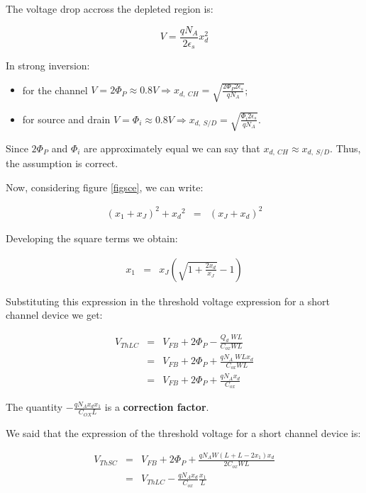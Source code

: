 \documentclass[a4paper, 12pt, twoside, openright]{report}
\begin{document}
{{{{\begin{itemize}
	The voltage drop accross the depleted region is:
	
	\begin{equation}
	V = \frac{q N_A}{2 \epsilon_s} x_d^2
	\end{equation}
	
	In strong inversion:
		\begin{itemize}
		\item for the channel $V = 2\Phi_P \approx 0.8 V \Rightarrow x_{d,\ CH} = \sqrt{\frac{2 \Phi_P 2 \epsilon_s}{q N_A}}$;
		\item for source and drain $V = \Phi_i \approx 0.8 V \Rightarrow x_{d,\ S/D} = \sqrt{\frac{\Phi_i 2 \epsilon_s}{q N_A}}$.
		\end{itemize}
	
	Since $2\Phi_P$ and $\Phi_i$ are approximately equal we can say that $x_{d,\ CH} \approx x_{d,\ S/D}$. Thus, the assumption is correct.
	\end{itemize}

Now, considering figure \ref{figsce}, we can write:

	\begin{eqnarray*}
	 \left(x_1+ x_J\right)^2 + {x_d}^2 &=& \left(x_J+ x_d \right)^2
	\end{eqnarray*}

Developing the square terms we obtain:

	\begin{eqnarray*}
	   x_1&=& x_J \left(\sqrt{1+\frac{2x_d}{x_J}} -1 \right)
	\end{eqnarray*}

Substituting this expression in the threshold voltage expression for a short channel device we get:

	\begin{eqnarray*}
	   V_{ThLC}&=& V_{FB}+2\Phi_P-\frac{Q_d\;WL}{C_{ox}WL}\\
	           &=& V_{FB}+2\Phi_P+\frac{qN_A\;WL x_d}{C_{ox}WL}\\
	           &=& V_{FB}+2\Phi_P+\frac{qN_A x_d}{C_{ox}}
	\end{eqnarray*}

The quantity $- \frac{q N_A x_d x_1}{C_{OX}L}$ is a \textbf{correction factor}.

We said that the expression of the threshold voltage for a short channel device is:

	\begin{eqnarray*}
	   V_{ThSC}&=& V_{FB}+2\Phi_P+\frac{qN_AW\left(L+L-2x_1\right)x_d}{2 C_{ox}WL}\\
	           &=& V_{ThLC} - \frac{qN_A x_d }{C_{ox}}\frac{x_1}{L}
	\end{eqnarray*}

}}}}
\end{document}

